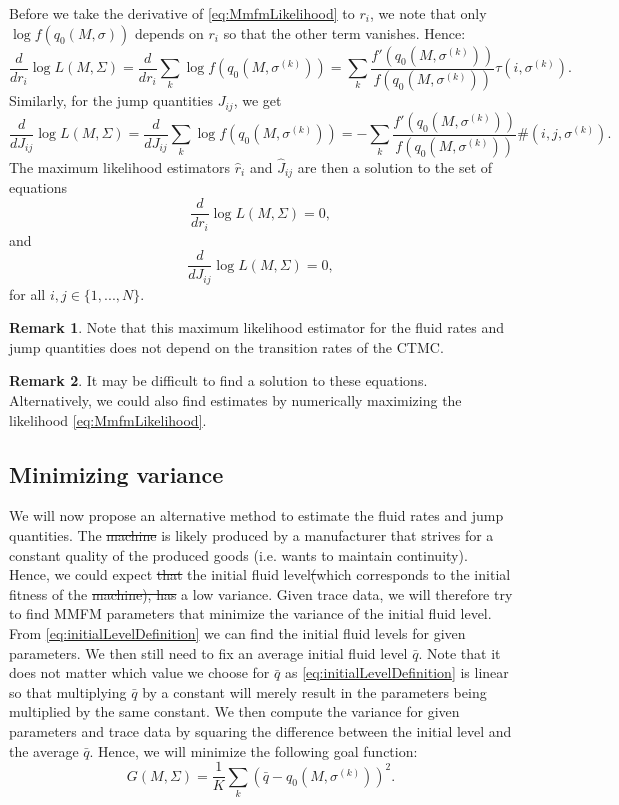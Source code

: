 \documentclass[a4paper]{thesis}
\theoremstyle{definition}
\newtheorem{remark}{Remark}[chapter]
\providecommand{\DIFaddtex}[1]{{\protect\color{blue}\uwave{#1}}} %
\providecommand{\DIFdeltex}[1]{{\protect\color{red}\sout{#1}}}                      %
\providecommand{\DIFaddbegin}{} %
\providecommand{\DIFaddend}{} %
\providecommand{\DIFdelbegin}{} %
\providecommand{\DIFdelend}{} %
\providecommand{\DIFadd}[1]{\texorpdfstring{\DIFaddtex{#1}}{#1}} %
\providecommand{\DIFdel}[1]{\texorpdfstring{\DIFdeltex{#1}}{}} %
\newcommand{\DIFscaledelfig}{0.5}
\newlength{\DIFdelgraphicswidth} %
\newlength{\DIFdelgraphicsheight} %
\newcommand{\DIFaddincludegraphics}[2][]{{\color{blue}\fbox{\DIFOincludegraphics[#1]{#2}}}} %
\newcommand{\DIFdelincludegraphics}[2][]{%
	\sbox{\DIFdelgraphicsbox}{\DIFOincludegraphics[#1]{#2}}%
	\settoboxwidth{\DIFdelgraphicswidth}{\DIFdelgraphicsbox} %
	\settoboxtotalheight{\DIFdelgraphicsheight}{\DIFdelgraphicsbox} %
	\scalebox{\DIFscaledelfig}{%
		\parbox[b]{\DIFdelgraphicswidth}{\usebox{\DIFdelgraphicsbox}\\[-\baselineskip] \rule{\DIFdelgraphicswidth}{0em}}\llap{\resizebox{\DIFdelgraphicswidth}{\DIFdelgraphicsheight}{%
				\setlength{\unitlength}{\DIFdelgraphicswidth}%
				\begin{picture}(1,1)%
				\thicklines\linethickness{2pt} %
				{\color[rgb]{1,0,0}\put(0,0){\framebox(1,1){}}}%
				{\color[rgb]{1,0,0}\put(0,0){\line( 1,1){1}}}%
				{\color[rgb]{1,0,0}\put(0,1){\line(1,-1){1}}}%
				\end{picture}%
			}\hspace*{3pt}}} %
} %
\DeclareRobustCommand{\DIFaddbegin}{\DIFOaddbegin \let\includegraphics\DIFaddincludegraphics} %
\DeclareRobustCommand{\DIFaddend}{\DIFOaddend \let\includegraphics\DIFOincludegraphics} %
\DeclareRobustCommand{\DIFdelbegin}{\DIFOdelbegin \let\includegraphics\DIFdelincludegraphics} %
\DeclareRobustCommand{\DIFdelend}{\DIFOaddend \let\includegraphics\DIFOincludegraphics} %
\begin{document}
	Before we take the derivative of \eqref{eq:MmfmLikelihood} to $r_i$, we note that only $\log f(q_0(M,\sigma))$ depends on $r_i$ so that the other term vanishes.
	Hence:
	\[
	\frac{d}{dr_i}\log L(M,\Sigma)
	=\frac{d}{dr_i}\sum_k\log f(q_0(M,\sigma^{(k)}))=\sum_k\frac{f'(q_0(M,\sigma^{(k)}))}{f(q_0(M,\sigma^{(k)}))}\tau(i,\sigma^{(k)}).
	\]
	Similarly, for the jump quantities $J_{ij}$, we get
	$$
	\frac{d}{dJ_{ij}}\log L(M,\Sigma)=\frac{d}{dJ_{ij}}\sum_k\log f(q_0(M,\sigma^{(k)}))=-\sum_k\frac{f'(q_0(M,\sigma^{(k)}))}{f(q_0(M,\sigma^{(k)}))}\#(i,j,\sigma^{(k)}).
	$$
	The maximum likelihood estimators $\hat r_i$ and $\hat J_{ij}$ are then a solution to the set of equations 
	\[
	\frac{d}{dr_i}\log L(M,\Sigma)=0,
	\]
	and
	\[
	\frac{d}{dJ_{ij}}\log L(M,\Sigma)=0,
	\]
	for all $i,j\in\{1,...,N\}$.
	
	\begin{remark}
		Note that this maximum likelihood estimator for the fluid rates and jump quantities does not depend on the transition rates of the CTMC.
	\end{remark}
	
	\begin{remark}
		It may be difficult to find a solution to these equations.
		Alternatively, we could also find estimates by numerically maximizing the likelihood \eqref{eq:MmfmLikelihood}. 
	\end{remark}
	
	\subsection{Minimizing variance}
	We will now propose an alternative method to estimate the fluid rates and jump quantities.
	The \DIFdelbegin \DIFdel{machine }\DIFdelend \DIFaddbegin \DIFadd{asset }\DIFaddend is likely produced by a manufacturer that strives for a constant quality of the produced goods (i.e. wants to maintain continuity).
	Hence, we could expect \DIFdelbegin \DIFdel{that }\DIFdelend the initial fluid level\DIFdelbegin \DIFdel{(}\DIFdelend \DIFaddbegin \DIFadd{, }\DIFaddend which corresponds to the initial fitness of the \DIFdelbegin \DIFdel{machine), has }\DIFdelend \DIFaddbegin \DIFadd{asset, to have }\DIFaddend a low variance.
	Given trace data, we will therefore try to find MMFM parameters that minimize the variance of the initial fluid level.
	From \eqref{eq:initialLevelDefinition} we can find the initial fluid levels for given parameters.
	We then still need to fix an average initial fluid level $\bar q$.
	Note that it does not matter which value we choose for $\bar q$ as \eqref{eq:initialLevelDefinition} is linear so that multiplying $\bar q$ by a constant will merely result in the parameters being multiplied by the same constant.
	We then compute the variance for given parameters and trace data by squaring the difference between the initial level and the average $\bar q$.
	Hence, we will minimize the following goal function:
	\begin{equation}\label{eq:MinVarianceGoalFunction}
	G(M,\Sigma)=\frac1K\sum_k \left(\bar q - q_0\left(M,\sigma^{(k)}\right)\right)^2.
	\end{equation}
	
\end{document}
